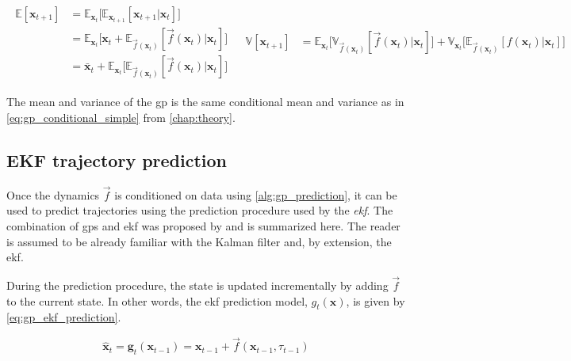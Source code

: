 \begin{subequations}
\begin{align}
\begin{split}
    \mathbb{E}[\boldsymbol{x}_{t+1}] &= \mathbb{E}_{\boldsymbol{x}_t}\big[ \mathbb{E}_{\boldsymbol{x}_{t+1}}[\boldsymbol{x}_{t+1} | \boldsymbol{x}_t] \big]\\
    &= \mathbb{E}_{\boldsymbol{x}_t}\big[ \boldsymbol{x}_t + \mathbb{E}_{\vec{f}(\boldsymbol{x}_t)}[\vec{f}(\boldsymbol{x}_t) | \boldsymbol{x}_t] \big]\\
    & = \bar{\boldsymbol{x}}_t + \mathbb{E}_{\boldsymbol{x}_t}\big[ \mathbb{E}_{\vec{f}(\boldsymbol{x}_t)}[\vec{f}(\boldsymbol{x}_t) | \boldsymbol{x}_t] \big]
\end{split}
\end{align}
\begin{align}
    \begin{split}
        \mathbb{V}[\boldsymbol{x}_{t+1}] &= \mathbb{E}_{\boldsymbol{x}_t}\big[\mathbb{V}_{\vec{f}(\boldsymbol{x}_t)}[\vec{f}(\boldsymbol{x}_t) | \boldsymbol{x}_t]\big] + \mathbb{V}_{\boldsymbol{x}_t}\big[ \mathbb{E}_{\vec{f}(\boldsymbol{x}_t)} [f(\boldsymbol{x}_t) | \boldsymbol{x}_t] \big]
    \end{split}
\end{align}
\end{subequations}

The mean and variance of the \acrshort{gp} is the same conditional mean and variance as in \cref{eq:gp_conditional_simple} from \cref{chap:theory}. 


\subsection{EKF trajectory prediction}
Once the dynamics $\vec{f}$ is conditioned on data using \cref{alg:gp_prediction}, it can be used to predict trajectories using the prediction procedure used by the \textit{\acrfull{ekf}}. The combination of \acrshort{gp}s and \acrshort{ekf} was proposed by \cite{gpekf} and is summarized here. The reader is assumed to be already familiar with the Kalman filter and, by extension, the \acrshort{ekf}.

During the prediction procedure, the state is updated incrementally by adding $\vec{f}$ to the current state. In other words, the \acrshort{ekf} prediction model, $g_t(\boldsymbol{x})$, is given by \cref{eq:gp_ekf_prediction}.

\begin{equation}\label{eq:gp_ekf_prediction}
    \hat{\boldsymbol{x}}_{t} = \boldsymbol{g}_t(\boldsymbol{x}_{t-1}) = \boldsymbol{x}_{t-1} + \vec{f}(\boldsymbol{x}_{t-1}, \tau_{t-1})
\end{equation}

